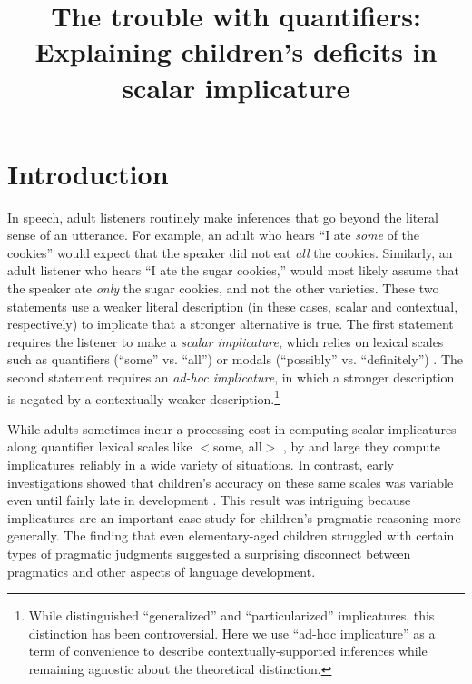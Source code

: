\documentclass[man]{apa2}
\title{The trouble with quantifiers: Explaining children's deficits in scalar implicature}
\begin{document}
\maketitle

\section{Introduction}

In speech, adult listeners routinely make inferences that go beyond the literal sense of an utterance. For example, an adult who hears ``I ate \emph{some} of the cookies'' would expect that the speaker did not eat \emph{all} the cookies. Similarly, an adult listener who hears ``I ate the sugar cookies,'' would most likely assume that the speaker ate \emph{only} the sugar cookies, and not the other varieties. These two statements use a weaker literal description (in these cases, scalar and contextual, respectively) to implicate that a stronger alternative is true. The first statement requires the listener to make a \emph{scalar implicature}, which relies on lexical scales such as quantifiers (``some'' vs. ``all'') or modals (``possibly'' vs. ``definitely'') \cite{horn1972}. The second statement requires an \emph{ad-hoc implicature}, in which a stronger description is negated by a contextually weaker description.\footnote{While  distinguished ``generalized'' and ``particularized'' implicatures, this distinction has been controversial. Here we use ``ad-hoc implicature'' as a term of convenience to describe contextually-supported inferences while remaining agnostic about the theoretical distinction.}

While adults sometimes incur a processing cost in computing scalar implicatures along quantifier lexical scales like  $<${\sc some, all}$>$ \cite{bott2004,grodner2010,huang2009b}, by and large they compute implicatures reliably in a wide variety of situations. In contrast, early investigations showed that children's accuracy on these same scales was variable even until fairly late in development \cite{noveck2001}. This result was intriguing because implicatures are an important case study for children's pragmatic reasoning more generally. The finding that even elementary-aged children struggled with certain types of pragmatic judgments suggested a surprising disconnect between pragmatics and other aspects of language development.
\end{document}
